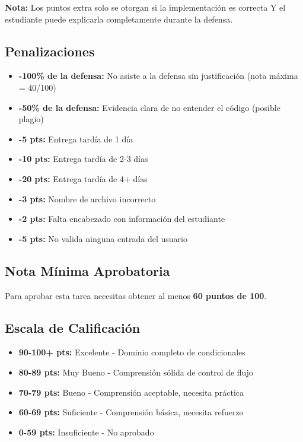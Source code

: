 \documentclass[12pt,a4paper]{article}
\begin{document}
\textbf{Nota:} Los puntos extra solo se otorgan si la implementación es correcta Y el estudiante puede explicarla completamente durante la defensa.

\subsection{Penalizaciones}

\begin{itemize}[leftmargin=*]
    \item \textbf{-100\% de la defensa:} No asiste a la defensa sin justificación (nota máxima = 40/100)
    \item \textbf{-50\% de la defensa:} Evidencia clara de no entender el código (posible plagio)
    \item \textbf{-5 pts:} Entrega tardía de 1 día
    \item \textbf{-10 pts:} Entrega tardía de 2-3 días
    \item \textbf{-20 pts:} Entrega tardía de 4+ días
    \item \textbf{-3 pts:} Nombre de archivo incorrecto
    \item \textbf{-2 pts:} Falta encabezado con información del estudiante
    \item \textbf{-5 pts:} No valida ninguna entrada del usuario
\end{itemize}

\subsection{Nota Mínima Aprobatoria}

Para aprobar esta tarea necesitas obtener al menos \textbf{60 puntos de 100}.

\subsection{Escala de Calificación}

\begin{itemize}
    \item \textbf{90-100+ pts:} Excelente - Dominio completo de condicionales
    \item \textbf{80-89 pts:} Muy Bueno - Comprensión sólida de control de flujo
    \item \textbf{70-79 pts:} Bueno - Comprensión aceptable, necesita práctica
    \item \textbf{60-69 pts:} Suficiente - Comprensión básica, necesita refuerzo
    \item \textbf{0-59 pts:} Insuficiente - No aprobado
\end{itemize}
\end{document}
